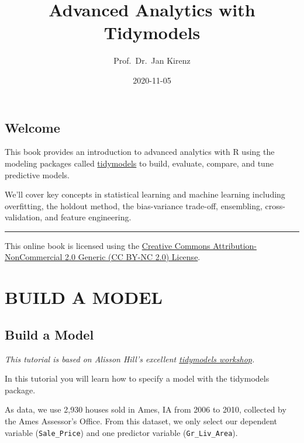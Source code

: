 \documentclass[
]{book}
\title{Advanced Analytics with Tidymodels}
\author{Prof.~Dr.~Jan Kirenz}
\date{2020-11-05}
\begin{document}
\maketitle

{
\setcounter{tocdepth}{1}
\tableofcontents
}
\hypertarget{welcome}{%
\chapter*{Welcome}\label{welcome}}

This book provides an introduction to advanced analytics with R using the modeling packages called \href{https://tidymodels.org}{tidymodels} to build, evaluate, compare, and tune predictive models.

We'll cover key concepts in statistical learning and machine learning including overfitting, the holdout method, the bias-variance trade-off, ensembling, cross-validation, and feature engineering.

\hfill\break

\begin{center}\rule{0.5\linewidth}{0.5pt}\end{center}

This online book is licensed using the \href{https://creativecommons.org/licenses/by-nc/2.0/}{Creative Commons Attribution-NonCommercial 2.0 Generic (CC BY-NC 2.0) License}.

\hfill\break

\hypertarget{part-build-a-model}{%
\part{BUILD A MODEL}\label{part-build-a-model}}

\hypertarget{intro}{%
\chapter{Build a Model}\label{intro}}

\emph{This tutorial is based on Alisson Hill's excellent \href{https://alison.rbind.io/tags/tidymodels/}{tidymodels workshop}.}

In this tutorial you will learn how to specify a model with the tidymodels package.

As data, we use 2,930 houses sold in Ames, IA from 2006 to 2010, collected by the Ames Assessor's Oﬃce. From this dataset, we only select our dependent variable (\texttt{Sale\_Price}) and one predictor variable (\texttt{Gr\_Liv\_Area}).
\end{document}
